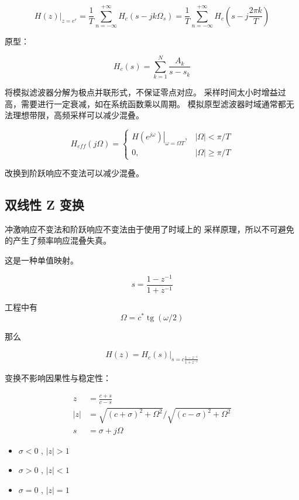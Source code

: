 \documentclass[cn,11pt,chinese,black,simple]{elegantbook}
\begin{document}
\[
\left.H(z)\right|_{z=e^{r}}=\frac{1}{T} \sum_{n=-\infty}^{+\infty} H_{c}\left(s-j k \Omega_{s}\right)=\frac{1}{T} \sum_{n=-\infty}^{+\infty} H_{c}\left(s-j \frac{2 \pi k}{T}\right)
\]


原型：

\[
H_{c}(s)=\sum_{k=1}^{N} \frac{A_{k}}{s-s_{k}}
\]


将模拟滤波器分解为极点并联形式，不保证零点对应。
采样时间太小时增益过高，需要进行一定衰减，如在系统函数乘以周期。
模拟原型滤波器时域通常都无法理想带限，高频采样可以减少混叠。



\[
H_{e f f}(j \Omega)=\left\{\begin{array}{cc}
\left.H\left(e^{j \omega}\right)\right|_{\omega=\Omega T}, & |\Omega|<\pi / T \\
0, & |\Omega| \geq \pi / T
\end{array}\right.
\]

改换到阶跃响应不变法可以减少混叠。


\subsection{双线性 Z 变换}

冲激响应不变法和阶跃响应不变法由于使用了时域上的
采样原理，所以不可避免的产生了频率响应混叠失真。

这是一种单值映射。

\[
s=\frac{1-z^{-1}}{1+z^{-1}}
\]

工程中有 \[
    \Omega=c^{*} \operatorname{tg}(\omega / 2)
    \]

那么

\[
H(z)=\left.H_{c}(s)\right|_{s=c \frac{1-z^{-1}}{1+z^{-1}}}
\]

变换不影响因果性与稳定性：

\[
\begin{aligned}
z & =\frac{c+s}{c-s} \\
|z| &=\sqrt{(c+\sigma)^{2}+\Omega^{2}} / \sqrt{(c-\sigma)^{2}+\Omega^{2}} \\ 
s &= \sigma + j \Omega
\end{aligned}
\]

\begin{itemize}
    \item \(\sigma < 0\) ,  \(|z| > 1\) 
    \item \(\sigma > 0\) ,  \(|z| < 1\) 
    \item \(\sigma = 0\) ,  \(|z| = 1\) 
\end{itemize}
\end{document}
